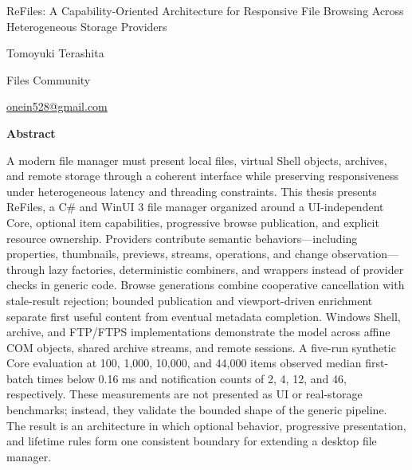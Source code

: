 \documentclass[10pt,a4paper,twoside]{article}
\makeatletter
\newcommand{\thesistitle}{ReFiles: A Capability-Oriented Architecture for Responsive File Browsing Across Heterogeneous Storage Providers}
\newcommand{\thesisauthor}{Tomoyuki Terashita}
\newcommand{\thesisinstitute}{Files Community}
\newcommand{\thesisemail}{onein528@gmail.com}
\makeatother
\begin{document}
\thispagestyle{plain}
\begin{center}
  \vspace*{9mm}

  {\fontsize{18}{22}\selectfont\thesistitle\par}
  \vspace{9mm}

  {\large\thesisauthor\par}
  \vspace{2.5mm}
  {\normalsize\thesisinstitute\par}
  \vspace{1mm}
  {\small\href{mailto:\thesisemail}{\thesisemail}\par}
\end{center}

\vspace{10mm}

\begin{center}
  \begin{minipage}{0.82\textwidth}
  \centering
  {\small\bfseries Abstract\par}
  \vspace{2.5mm}
  \small
  \raggedright
  A modern file manager must present local files, virtual Shell objects, archives, and remote storage through a
  coherent interface while preserving responsiveness under heterogeneous latency and threading constraints.
  This thesis presents ReFiles, a C\# and WinUI 3 file manager organized around a UI-independent Core, optional
  item capabilities, progressive browse publication, and explicit resource ownership. Providers contribute
  semantic behaviors---including properties, thumbnails, previews, streams, operations, and change
  observation---through lazy factories, deterministic combiners, and wrappers instead of provider checks in
  generic code. Browse generations combine cooperative cancellation with stale-result rejection; bounded
  publication and viewport-driven enrichment separate first useful content from eventual metadata completion.
  Windows Shell, archive, and FTP/FTPS implementations demonstrate the model across affine COM objects, shared
  archive streams, and remote sessions. A five-run synthetic Core evaluation at 100, 1,000, 10,000, and 44,000
  items observed median first-batch times below 0.16 ms and notification counts of 2, 4, 12, and 46,
  respectively. These measurements are not presented as UI or real-storage benchmarks; instead, they validate
  the bounded shape of the generic pipeline. The result is an architecture in which optional behavior,
  progressive presentation, and lifetime rules form one consistent boundary for extending a desktop file
  manager.
  \end{minipage}
\end{center}
\end{document}
